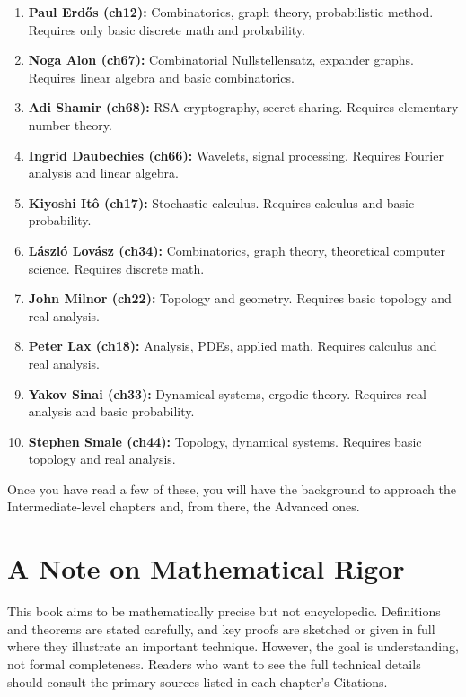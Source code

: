 \begin{enumerate}
    \item \textbf{Paul Erd\H{o}s (ch12):} Combinatorics, graph theory, probabilistic method. Requires only basic discrete math and probability.
    \item \textbf{Noga Alon (ch67):} Combinatorial Nullstellensatz, expander graphs. Requires linear algebra and basic combinatorics.
    \item \textbf{Adi Shamir (ch68):} RSA cryptography, secret sharing. Requires elementary number theory.
    \item \textbf{Ingrid Daubechies (ch66):} Wavelets, signal processing. Requires Fourier analysis and linear algebra.
    \item \textbf{Kiyoshi It\^o (ch17):} Stochastic calculus. Requires calculus and basic probability.
    \item \textbf{L\'aszl\'o Lov\'asz (ch34):} Combinatorics, graph theory, theoretical computer science. Requires discrete math.
    \item \textbf{John Milnor (ch22):} Topology and geometry. Requires basic topology and real analysis.
    \item \textbf{Peter Lax (ch18):} Analysis, PDEs, applied math. Requires calculus and real analysis.
    \item \textbf{Yakov Sinai (ch33):} Dynamical systems, ergodic theory. Requires real analysis and basic probability.
    \item \textbf{Stephen Smale (ch44):} Topology, dynamical systems. Requires basic topology and real analysis.
\end{enumerate}

Once you have read a few of these, you will have the background to approach the Intermediate-level chapters and, from there, the Advanced ones.

\section{A Note on Mathematical Rigor}

This book aims to be mathematically precise but not encyclopedic. Definitions and theorems are stated carefully, and key proofs are sketched or given in full where they illustrate an important technique. However, the goal is understanding, not formal completeness. Readers who want to see the full technical details should consult the primary sources listed in each chapter's Citations.
